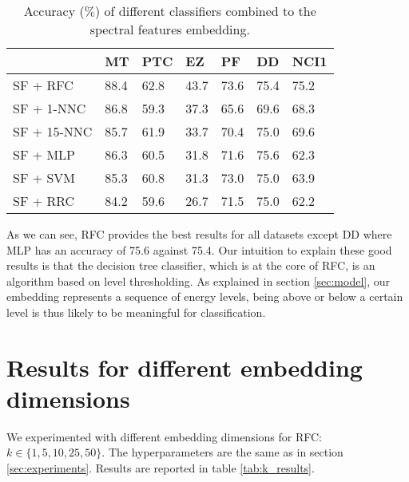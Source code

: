 \documentclass{article}
\begin{document}
\begin{table}[h]
  \begin{center}
  \renewcommand{\arraystretch}{1.2}
    \begin{tabular}[t]{l|M{1.2cm} M{1.2cm} M{1.2cm} M{1.2cm} M{1.2cm} M{1.2cm}}
                    & MT   &     PTC       &      EZ       & PF      & DD      & NCI1 \\
    \hline
      SF + RFC    & 88.4 & 62.8 & 43.7 & 73.6 &  75.4   & 75.2 \\
      SF + 1-NNC  & 86.8 & 59.3 & 37.3 & 65.6 &  69.6   & 68.3 \\
      SF + 15-NNC & 85.7 & 61.9 & 33.7 & 70.4 &  75.0   & 69.6 \\
      SF + MLP    & 86.3 & 60.5 & 31.8 & 71.6 &  75.6   & 62.3 \\
      SF + SVM    & 85.3 & 60.8 & 31.3 & 73.0 &  75.0   & 63.9 \\
      SF + RRC    & 84.2 & 59.6 & 26.7 & 71.5 &  75.0   & 62.2 \\
      
      \end{tabular}
      \renewcommand{\arraystretch}{4}
  \end{center}
  \caption{Accuracy ($\%$) of different classifiers combined to the spectral features embedding.}
  \label{tab:all_results}
\end{table}



As we can see, RFC provides the best results for all datasets except DD where MLP has an accuracy of 75.6 against 75.4. Our intuition to explain these good results is that the decision tree classifier, which is at the core of RFC, is an algorithm based on level thresholding. As explained in section \ref{sec:model}, our embedding represents a sequence of energy levels, being above or below a certain level is thus likely to be meaningful for classification.

\section{Results for different embedding dimensions}
\label{app:k_results}

We experimented with different embedding dimensions for RFC: $k \in \{1, 5, 10, 25, 50 \}$. The hyperparameters are the same as in section \ref{sec:experiments}. Results are reported in table \ref{tab:k_results}.
\end{document}
